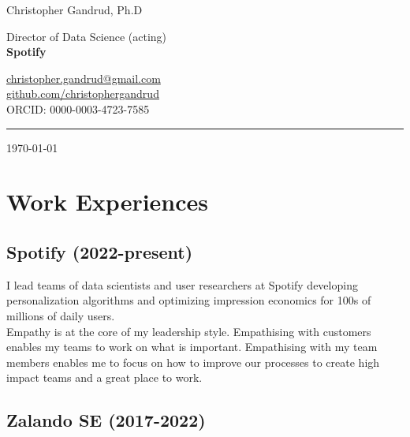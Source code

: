 \documentclass[a4paper]{article}
\begin{document}
    \begin{flushright}
        {\huge{Christopher Gandrud, Ph.D}} \\
        \vspace{0.251cm}

        Director of Data Science (acting) \\
        {\bf{\large{Spotify}}} \\
        \vspace{0.25cm}

        \href{mailto:christopher.gandrud@gmail.com}{christopher.gandrud@gmail.com}\\
        \href{https://github.com/christophergandrud}{github.com/christophergandrud}\\[0.25cm]

        ORCID: 0000-0003-4723-7585\\[0.25cm]

        \medskip\hrule height 1pt

        \vspace{0.5cm}

        \today

    \end{flushright}



\vspace{0.5cm}

\section*{Work Experiences}

\subsection*{Spotify (2022-present)}

I lead teams of data scientists and user researchers at Spotify developing personalization algorithms and optimizing impression economics for 100s of millions of daily users. \\

\noindent Empathy is at the core of my leadership style. Empathising with customers enables my teams to work on what is important. Empathising with my team members enables me to focus on how to improve our processes to create high impact teams and a great place to work.

\subsection*{Zalando SE (2017-2022)}
\end{document}

